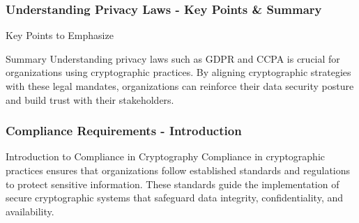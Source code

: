 \documentclass{beamer}
\begin{document}
\begin{frame}[fragile]
    \frametitle{Understanding Privacy Laws - Key Points & Summary}
    \begin{block}{Key Points to Emphasize}
    \end{block}
    
    \begin{block}{Summary}
        Understanding privacy laws such as GDPR and CCPA is crucial for organizations using cryptographic practices. By aligning cryptographic strategies with these legal mandates, organizations can reinforce their data security posture and build trust with their stakeholders.
    \end{block}
\end{frame}

\begin{frame}[fragile]
  \frametitle{Compliance Requirements - Introduction}
  \begin{block}{Introduction to Compliance in Cryptography}
    Compliance in cryptographic practices ensures that organizations follow established standards and regulations to protect sensitive information. These standards guide the implementation of secure cryptographic systems that safeguard data integrity, confidentiality, and availability.
  \end{block}
\end{frame}
\end{document}
